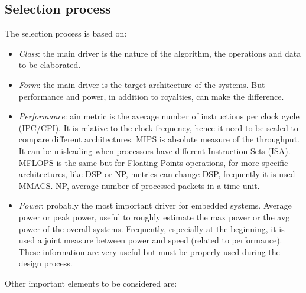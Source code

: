\subsection{Selection process}
The selection process is based on: 
\begin{itemize}
    \item \textit{Class}: the main driver is the nature of the algorithm, the operations and data to be elaborated.
    \item \textit{Form}: the main driver is the target architecture of the systems. 
        But performance and power, in addition to royalties, can make the difference.
    \item \textit{Performance}: ain metric is the average number of instructions per clock cycle (IPC/CPI). 
        It is relative to the clock frequency, hence it need to be scaled to compare different architectures.
        MIPS is absolute measure of the throughput. 
        It can be misleading when processors have different Instruction Sets (ISA). 
        MFLOPS is the same but for Floating Points operations, for more specific architectures, like DSP or NP, metrics can change
        DSP, frequently it is used MMACS.
        NP, average number of processed packets in a time unit.
    \item \textit{Power}: probably the most important driver for embedded systems. 
        Average power or peak power, useful to roughly estimate the max power or the avg power of the overall systems.
        Frequently, especially at the beginning, it is used a joint measure between power and speed (related to performance).
        These information are very useful but must be properly used during the design process.
\end{itemize}
Other important elements to be considered are:
